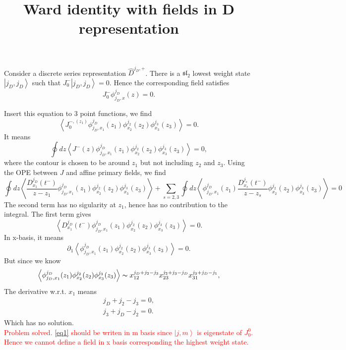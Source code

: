 \documentclass[10pt,a4paper]{article}
\numberwithin{equation}{section}
\newcommand{\ket}[1]{\left| #1 \right\rangle}
\newcommand{\vev}[1]{\left< #1 \right>}
\begin{document}
\title{Ward identity with fields in D representation}
\maketitle


Consider a discrete series representation $\hat{D}^{j_{D},+}$. There is a $\mathfrak{sl}_{2}$ lowest weight state $\ket{j_{D},j_{D}}$ such that 
$J^{-}_{0} \ket{j_{D},j_{D}} = 0$. Hence the corresponding field satisfies 
\begin{equation}
    J^{-}_{0} \phi^{j_{D}}_{j_{D},x}(z) = 0. \label{eq1}
\end{equation}

Insert this equation to 3 point functions, we find 
\begin{equation}
    \vev{J^{-,(z_{1})}_{0} \phi^{j_{D}}_{j_{D},x_{1}}(z_{1}) \phi^{j_{2}}_{x_{2}}(z_{2}) \phi^{j_{3}}_{x_{3}}(z_{3})} = 0.
\end{equation}
It means 
\begin{equation}
    \oint dz \vev{J^{-}(z) \phi^{j_{D}}_{j_{D},x_{1}}(z_{1}) \phi^{j_{2}}_{x_{2}}(z_{2}) \phi^{j_{3}}_{x_{3}}(z_{3})} = 0,
\end{equation}
where the contour is chosen to be around $z_{1}$ but not including $z_{2}$ and $z_{3}$. Using the OPE between $J$ and affine primary
fields, we find 
\begin{equation}
    \oint dz \vev{\frac{D^{j_{D}}_{x_{1}}(t^{-})}{z-z_{1}} \phi^{j_{D}}_{j_{D},x_{1}}(z_{1}) \phi^{j_{2}}_{x_{2}}(z_{2}) \phi^{j_{3}}_{x_{3}}(z_{3})} +
    \sum_{s=2,3} \oint dz \vev{ \phi^{j_{D}}_{j_{D},x_{1}}(z_{1}) \frac{D^{j_{s}}_{x_{s}}(t^{-})}{z-z_{s}} \phi^{j_{2}}_{x_{2}}(z_{2}) \phi^{j_{3}}_{x_{3}}(z_{3})} = 0
\end{equation}
The second term has no sigularity at $z_{1}$, hence has no contribution to the integral. The first term gives 
\begin{equation}
    \vev{D^{j_{D}}_{x_{1}}(t^{-}) \phi^{j_{D}}_{j_{D},x_{1}}(z_{1}) \phi^{j_{2}}_{x_{2}}(z_{2}) \phi^{j_{3}}_{x_{3}}(z_{3})} = 0.
\end{equation}
In x-basis, it means 
\begin{equation}
    \partial_{1}\vev{ \phi^{j_{D}}_{j_{D},x_{1}}(z_{1}) \phi^{j_{2}}_{x_{2}}(z_{2}) \phi^{j_{3}}_{x_{3}}(z_{3})} = 0.
\end{equation}
But since we know 
\begin{equation}
    \vev{ \phi^{j_{D}}_{j_{D},x_{1}}(z_{1}) \phi^{j_{2}}_{x_{2}}(z_{2}) \phi^{j_{3}}_{x_{3}}(z_{3})} \thicksim  x_{12}^{j_{D} + j_{2}-j_{3}}x_{23}^{j_{2}+j_{3} - j_{D}} x_{31}^{j_{3} + j_{D}-j_{1}},
\end{equation}
The derivative w.r.t. $x_{1}$ means
\begin{align}
    j_{D} + j_{2}-j_{3} = 0, \\
    j_{3} + j_{D}-j_{2} = 0.
\end{align}
Which has no solution.\\

\textcolor{red}{Problem solved. \ref{eq1} should be writen in m basis since $\ket{j,m}$ is eigenstate of $J^{0}_{0}$. Hence we 
cannot define a field in x basis corresponding the highest weight state.}
\end{document}
